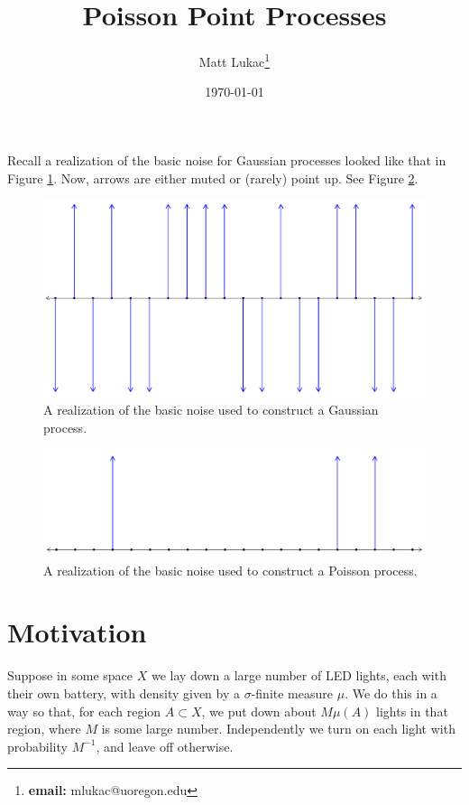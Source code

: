 \documentclass[11pt]{article}
\title{Poisson Point Processes}
\author{Matt Lukac\thanks{\textbf{email:} mlukac@uoregon.edu}}
\date{\today}
\begin{document}
\maketitle
Recall a realization of the basic noise for Gaussian processes looked like that in Figure \ref{fig:gaussnoise}. Now, arrows are either muted or (rarely) point up. See Figure \ref{fig:poisnoise}.
\begin{figure}
	\centering
	\includegraphics[width=0.9\linewidth]{gauss_noise}
	\caption{A realization of the basic noise used to construct a Gaussian process.}
	\label{fig:gaussnoise}
\end{figure}
\begin{figure}
	\centering
	\includegraphics[width=0.9\linewidth]{pois_noise}
	\caption{A realization of the basic noise used to construct a Poisson process.}
	\label{fig:poisnoise}
\end{figure}

\section{Motivation}
Suppose in some space $X$ we lay down a large number of LED lights, each with their own battery, with density given by a $\sigma$-finite measure $\mu$. We do this in a way so that, for each region $A\subset X$, we put down about $M\mu(A)$ lights in that region, where $M$ is some large number. Independently we turn on each light with probability $M^{-1}$, and leave off otherwise.
\end{document}
